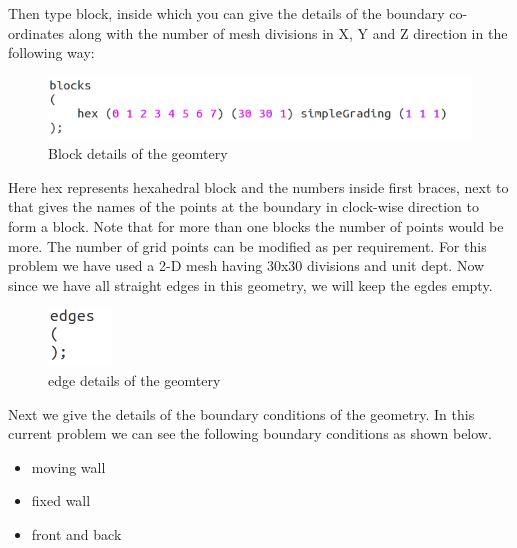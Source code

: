 \documentclass[a4paper,12pt]{report}
\begin{document}
\flushleft Then type block, inside which you can give the details of the boundary co-ordinates along with the number of mesh divisions in X, Y and Z direction in the following way$:$

\begin{figure}[ht]  
\begin{center}  
\includegraphics[scale=0.66]{blocks.png}
\caption{Block details of the geomtery}
\label{blocks}
\end{center}  
\end{figure}

\flushleft Here hex represents hexahedral block and the numbers inside first braces, next to that gives the names of the points at the boundary in clock-wise direction to form a block. Note that for more than one blocks the number of points would be more. The number of grid points can be modified as per requirement. For this problem we have used a 2-D mesh having 30x30 divisions and unit dept. Now since we have all straight edges in this geometry, we will keep the egdes empty.

\begin{figure}[ht]  
\begin{center}  
\includegraphics[scale=0.66]{edges.png}
\caption{edge details of the geomtery}
\label{edges}
\end{center}  
\end{figure}


\flushleft Next we give the details of the boundary conditions of the geometry. In this current problem we can see the following boundary conditions as shown below.

\begin{itemize}
  \item moving wall
  \item fixed wall
  \item front and back
\end{itemize}
\end{document}
